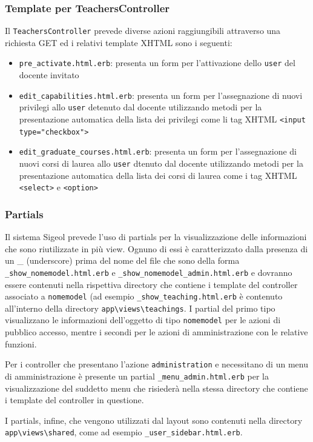 \documentclass[11pt,a4paper]{article}
\begin{document}
\subsubsection*{Template per TeachersController}
Il \verb|TeachersController| prevede diverse azioni raggiungibili attraverso una richiesta GET ed i relativi template XHTML sono i seguenti:
\begin{itemize}
 \item \verb|pre_activate.html.erb|: presenta un form per l'attivazione dello \verb|user| del docente invitato
 \item \verb|edit_capabilities.html.erb|: presenta un form per l'assegnazione di nuovi privilegi allo \verb|user| detenuto dal docente utilizzando metodi per la presentazione automatica della lista dei privilegi come li tag XHTML \verb|<input type="checkbox">|
 \item \verb|edit_graduate_courses.html.erb|: presenta un form per l'assegnazione di nuovi corsi di laurea allo \verb|user| dtenuto dal docente utilizzando metodi per la presentazione automatica della lista dei corsi di laurea come i tag XHTML \verb|<select>| e \verb|<option>|
\end{itemize}
\subsubsection{Partials}
Il sistema Sigeol prevede l'uso di partials per la visualizzazione delle informazioni che sono riutilizzate in più view. Ognuno di essi è caratterizzato dalla presenza di un \_ (underscore) prima del nome del file che sono della forma \verb|_show_nomemodel.html.erb| e \verb|_show_nomemodel_admin.html.erb| e dovranno essere contenuti nella rispettiva directory che contiene i template del controller associato a \verb|nomemodel| (ad esempio \verb|_show_teaching.html.erb| è contenuto all'interno della directory \verb|app\views\teachings|. I partial del primo tipo visualizzano le informazioni dell'oggetto di tipo \verb|nomemodel| per le azioni di pubblico accesso, mentre i secondi per le azioni di amministrazione con le relative funzioni.

Per i controller che presentano l'azione \verb|administration| e necessitano di un menu di amministrazione è presente un partial \verb|_menu_admin.html.erb| per la visualizzazione del suddetto menu che risiederà nella stessa directory che contiene i template del controller in questione.

I partials, infine, che vengono utilizzati dal layout sono contenuti nella directory \verb|app\views\shared|, come ad esempio \verb|_user_sidebar.html.erb|.
\end{document}

